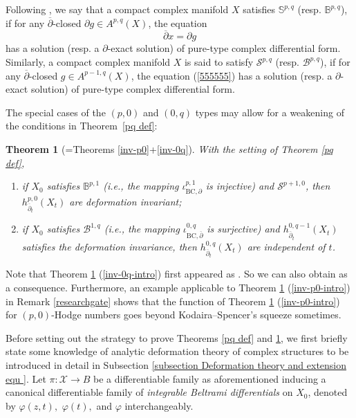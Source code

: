 \documentclass[12pt]{amsart}
\numberwithin{equation}{section}
\theoremstyle{definition}
\theoremstyle{definition}
\theoremstyle{definition}
\renewcommand{\1}{\mathsf{1}}
\newcommand{\db}{\overline{\partial}}
\renewcommand{\>}{\rightarrow}
\newcommand{\p}{\partial}
\def\p{\partial}
\theoremstyle{plain} %
\newtheorem{bigthm}{Theorem}
\theoremstyle{plain} %
\theoremstyle{plain} %
\begin{document}
	Following \cite[Notation 3.5]{RZ18}, we say that a compact complex manifold $X$ satisfies $\mathbb{S}^{p,q}$
	(resp. $\mathbb{B}^{p,q}$), if for any $\db$-closed
	$\p g\in A^{p,q}(X)$, the equation
	\begin{equation}\label{555555}
		\db x = \p g
	\end{equation}
	has a solution
	(resp. a $\p$-exact solution) of pure-type complex differential form. Similarly,
	a compact complex manifold $X$ is said to satisfy
	$\mathcal{S}^{p,q}$
	(resp. $\mathcal{B}^{p,q}$), if
	for any $\db$-closed $g\in A^{p-1,q}(X)$, the equation (\ref{555555}) has a solution
	(resp. a $\p$-exact solution) of pure-type complex differential form.
	
	The special cases of the $(p,0)$  and $(0,q)$  types may allow for a weakening of the conditions in Theorem~\ref{pq def}:
	\begin{bigthm}[=Theorems \ref{inv-p0}+\ref{inv-0q}]\label{inv-p0-0q-intro}With the setting of Theorem \ref{pq def},
		\begin{enumerate}[$(1)$]
			\item \label{inv-p0-intro}
			if $X_0$ satisfies $\mathbb{B}^{p,1}$ (i.e., the mapping $\iota_{\mathrm {BC},\p}^{p,1}$ is injective) and $\mathcal{S}^{p+1,0}$, then $h^{p,0}_{\db_t}(X_t)$ are deformation invariant;
			\item \label{inv-0q-intro} if $X_0$ satisfies $\mathcal {B}^{1,q}$ (i.e., the mapping $\iota^{0,q}_{\mathrm {BC},\db}$ is surjective)
			and $h^{0,q-1}_{\db_t}(X_t)$  satisfies the deformation invariance, then
			$h^{0,q}_{\db_t}(X_t)$ are independent of $t$.
		\end{enumerate}
	\end{bigthm}
	
	Note  that Theorem \ref{inv-p0-0q-intro} (\ref{inv-0q-intro}) first appeared as \cite[Theorem 3.7]{RZ18}. So we can also obtain \cite[Remark 3.8, Corollary 3.9]{RZ18}  as a consequence. Furthermore, an example applicable to  Theorem  \ref{inv-p0-0q-intro} (\ref{inv-p0-intro}) in Remark \ref{researchgate} shows that the function of Theorem  \ref{inv-p0-0q-intro} (\ref{inv-p0-intro}) for $(p,0)$-Hodge numbers goes beyond Kodaira--Spencer's squeeze \cite[Theorem 13]{KS60} sometimes.
	
	Before setting out the strategy to prove Theorems \ref{pq def} and \ref{inv-p0-0q-intro}, we first briefly state some knowledge of analytic deformation theory of complex structures to be introduced in detail in Subsection \ref{subsection Deformation theory and extension equ }. Let $\pi:\mathcal{X} \rightarrow B$ be a differentiable family as aforementioned inducing a canonical differentiable family of \textit{integrable Beltrami differentials} on $X_0$, denoted by $\varphi(z,t),$ $\varphi{(t)},$ and $\varphi$ interchangeably.
\end{document}
